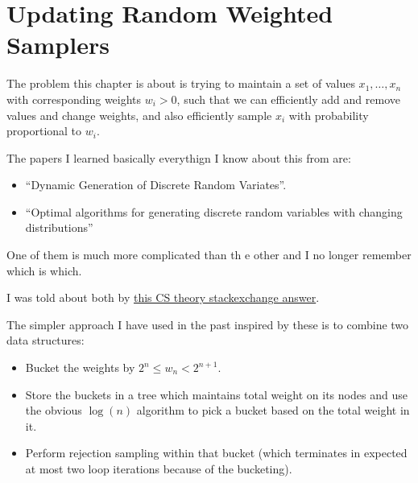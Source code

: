\chapter{Updating Random Weighted Samplers}

The problem this chapter is about is trying to maintain a set of values \(x_1, \ldots, x_n\) with corresponding weights \(w_i > 0\),
such that we can efficiently add and remove values and change weights, and also efficiently sample \(x_i\) with probability proportional to \(w_i\).

The papers I learned basically everythign I know about this from are:

\begin{itemize}
\item ``Dynamic Generation of Discrete Random Variates''\cite{DBLP:journals/mst/MatiasVN03}.
\item ``Optimal algorithms for generating discrete random variables with changing distributions''\cite{hagerup1993optimal}
\end{itemize}

One of them is much more complicated than th e other and I no longer remember which is which.

I was told about both by \href{https://cstheory.stackexchange.com/a/37651/4624}{this CS theory stackexchange answer}.

The simpler approach I have used in the past inspired by these is to combine two data structures:

\begin{itemize}
\item Bucket the weights by \(2^n \leq w_n < 2^{n + 1}\).
\item Store the buckets in a tree which maintains total weight on its nodes and use the obvious \(\log(n)\) algorithm to pick a bucket based on the total weight in it.
\item Perform rejection sampling within that bucket (which terminates in expected at most two loop iterations because of the bucketing).
\end{itemize}
